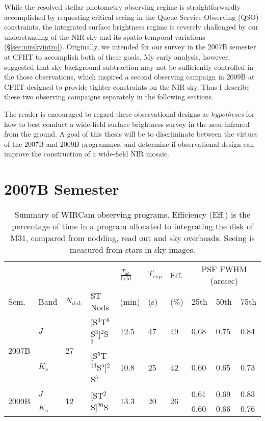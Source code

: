 \documentclass[iop]{emulateapj}
\begin{document}
While the resolved stellar photometry observing regime is straightforwardly accomplished by requesting critical seeing in the Queue Service Observing (QSO) constraints, the integrated surface brightness regime is severely challenged by our understanding of the NIR sky and its spatio-temporal variations (\S\ref{sec:nirskyintro}). Originally, we intended for our survey in the 2007B semester at CFHT to accomplish both of these goals. My early analysis, however, suggested that sky background subtraction may not be sufficiently controlled in the those observations, which inspired a second observing campaign in 2009B at CFHT designed to provide tighter constraints on the NIR sky. Thus I describe these two observing campaigns separately in the following sections.

The reader is encouraged to regard these observational designs as \emph{hypotheses} for how to best conduct a wide-field surface brightness survey in the near-infrared from the ground. A goal of this thesis will be to discriminate between the virtues of the 2007B and 2009B programmes, and determine if observational design can improve the construction of a wide-field NIR mosaic.

\section{2007B Semester}
\label{sec:obs7}

\begin{table}[t]
    \caption[Summary of WIRCam observing programs]{Summary of WIRCam observing programs. Efficiency (Eff.) is the percentage of time in a program allocated to integrating the disk of M31, compared from nodding, read out and sky overheads. Seeing is measured from stars in sky images.}
    \label{tab:obssummary}
    
    \begin{tabular}{llllllllll}
        & & & & $\frac{T_\mathrm{int}}{\mathrm{field}}$ & $T_\mathrm{exp}$ & Eff. & \multicolumn{3}{c}{PSF FWHM (arcsec)} \\ \cline{8-10}
    Sem. & Band & $N_\mathrm{disk}$ & ST Nods & (min) &  (s) &  (\%) & 25th  & 50th & 75th \\
    \hline
    \multirow{2}{*}{2007B} & $J$ & \multirow{2}{*}{27} & [S$^3$T$^8$S$^3$]$^{2}$S$^3$ & 12.5 & 47 & 49 & 0.68 & 0.75 & 0.84 \\
     & $K_s$ &  & [S$^5$T$^{13}$S$^5$]${^2}$S$^5$ & 10.8 & 25 & 42 & 0.60 &  0.65 & 0.73 \\
     \hline
     \multirow{2}{*}{2009B} & $J$ & \multirow{2}{*}{12} & \multirow{2}{*}{[ST$^2$S]$^{20}$S} & \multirow{2}{*}{13.3} & \multirow{2}{*}{20} & \multirow{2}{*}{26} & 0.61 & 0.69 & 0.83 \\
      & $K_s$ & & & & &  & 0.60 & 0.66 & 0.76 \\
      
    \end{tabular}
\end{table}
\end{document}

